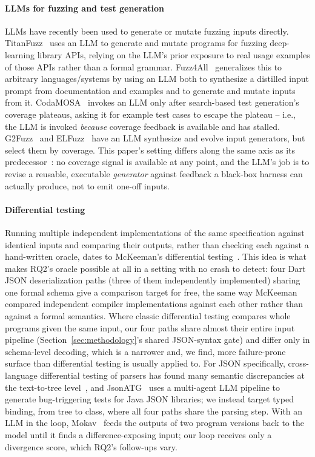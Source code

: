 \paragraph{LLMs for fuzzing and test generation}
LLMs have recently been used to generate or mutate fuzzing inputs directly.
TitanFuzz~\cite{deng2023titanfuzz} uses an LLM to generate and mutate
programs for fuzzing deep-learning library APIs, relying on the LLM's prior
exposure to real usage examples of those APIs rather than a formal grammar.
Fuzz4All~\cite{xia2024fuzz4all} generalizes this to arbitrary
languages/systems by using an LLM both to synthesize a distilled input
prompt from documentation and examples and to generate and mutate inputs
from it. CodaMOSA~\cite{lemieux2023codamosa} invokes an LLM only after
search-based test generation's coverage plateaus, asking it for example
test cases to escape the plateau -- i.e., the LLM is invoked \emph{because}
coverage feedback is available and has stalled. G2Fuzz~\cite{zhang2025g2fuzz}
and ELFuzz~\cite{chen2025elfuzz} have an LLM synthesize and evolve input
generators, but select them by coverage. This paper's setting differs
along the same axis as its predecessor~\priorworkcite: no coverage
signal is available at any point, and the LLM's job is to revise a reusable,
executable \emph{generator} against feedback a black-box harness can
actually produce, not to emit one-off inputs.

\paragraph{Differential testing}
Running multiple independent implementations of the same specification
against identical inputs and comparing their outputs, rather than checking
each against a hand-written oracle, dates to McKeeman's differential
testing~\cite{mckeeman1998differential}. This idea is what makes RQ2's
oracle possible at all in a setting with no crash to detect: four
Dart JSON deserialization paths (three of them independently implemented) sharing one
formal schema give a comparison target for free, the same way McKeeman
compared independent compiler implementations against each other rather
than against a formal semantics. Where classic differential testing
compares whole programs given the same input, our four paths share almost
their entire input pipeline (Section~\ref{sec:methodology}'s shared
JSON-syntax gate) and differ only in schema-level decoding, which is a
narrower and, we find, more failure-prone surface than differential testing
is usually applied to. For JSON specifically, cross-language differential
testing of parsers has found many semantic discrepancies at the text-to-tree
level~\cite{moller2024crosslanguage}, and JsonATG~\cite{wang2025jsonatg} uses
a multi-agent LLM pipeline to generate bug-triggering tests for Java JSON
libraries; we instead target typed binding, from tree to class, where all four
paths share the parsing step. With an LLM in the loop,
Mokav~\cite{etemadi2025mokav} feeds the outputs of two program versions back
to the model until it finds a difference-exposing input; our loop receives
only a divergence score, which RQ2's follow-ups vary.

